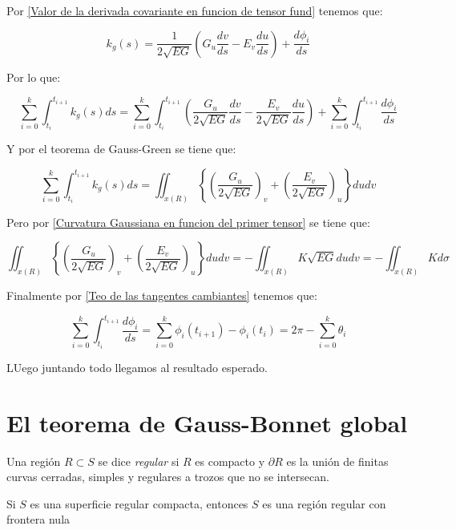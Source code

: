 \documentclass[11pt]{article}
\newenvironment{proof}[1][Demostraci\'on]{\begin{trivlist}
		\item[\hskip \labelsep {\bfseries #1}]}{\end{trivlist}}
\newenvironment{definition}[1][Definici\'on]{\begin{trivlist}
		\item[\hskip \labelsep {\bfseries #1}]}{\end{trivlist}}
\newenvironment{remark}[1][Observaci\'on]{\begin{trivlist}
		\item[\hskip \labelsep {\bfseries #1}]}{\end{trivlist}}
\newcommand{\qed}{\nobreak \ifvmode \relax \else
	\ifdim\lastskip<1.5em \hskip-\lastskip
	\hskip1.5em plus0em minus0.5em \fi \nobreak
	\vrule height0.75em width0.5em depth0.25em\fi}
\begin{document}
\begin{proof}
	
	Por \ref{Valor de la derivada covariante en funcion de tensor fund} tenemos que:
	
	\[
	k_g(s) = \dfrac{1}{2 \sqrt{EG}} \left(G_u \dfrac{dv}{ds} - E_v \dfrac{du}{ds}\right) + \dfrac{d \phi_i}{ds}
	\]
	
	Por lo que:
	
	\[
	\sum\limits_{i=0}^{k}{\int_{t_i}^{t_{i+1}}{k_g(s)ds}} = \sum\limits_{i=0}^{k}{\int_{t_i}^{t_{i+1}}{\left(\dfrac{G_u}{2 \sqrt{EG}} \dfrac{dv}{ds} - \dfrac{E_v}{2 \sqrt{EG}} \dfrac{du}{ds}\right)}} + \sum\limits_{i=0}^{k}{\int_{t_i}^{t_{i+1}}{\dfrac{d \phi_i}{ds}}}
	\]
	
	Y por el teorema de Gauss-Green se tiene que:
	
	\[
		\sum\limits_{i=0}^{k}{\int_{t_i}^{t_{i+1}}{k_g(s)ds}} = \iint_{x(R)}{ \left\lbrace \left(\dfrac{G_u}{2 \sqrt{EG}}\right)_v + \left(\dfrac{E_v}{2 \sqrt{EG}}\right)_u \right\rbrace du dv}
	\]
	
	Pero por \ref{Curvatura Gaussiana en funcion del primer tensor} se tiene que:
	
	\[
		\iint_{x(R)}{ \left\lbrace \left(\dfrac{G_u}{2 \sqrt{EG}}\right)_v + \left(\dfrac{E_v}{2 \sqrt{EG}}\right)_u \right\rbrace du dv} = - \iint_{x(R)}{K\sqrt{EG}dudv} = - \iint_{x(R)}{K d\sigma} 
	\]
	
	Finalmente por \ref{Teo de las tangentes cambiantes} tenemos que:
	
	\[
		\sum\limits_{i=0}^{k}{\int_{t_i}^{t_{i+1}}{\dfrac{d \phi_i}{ds}}} = \sum\limits_{i=0}^{k}{\phi_i(t_{i+1}) - \phi_i(t_i)} = 2\pi - \sum\limits_{i=0}^{k}{\theta_i}
	\]
	
	LUego juntando todo llegamos al resultado esperado. \qed
	
\end{proof}

\section{El teorema de Gauss-Bonnet global}

\begin{definition}
	Una regi\'on $R \subset S$ se dice \textit{regular} si $R$ es compacto y $\partial R$ es la uni\'on de finitas curvas cerradas, simples y regulares a trozos que no se intersecan.
\end{definition}

\begin{remark}
	Si $S$ es una superficie regular compacta, entonces $S$ es una regi\'on regular con frontera nula
\end{remark}
\end{document}
